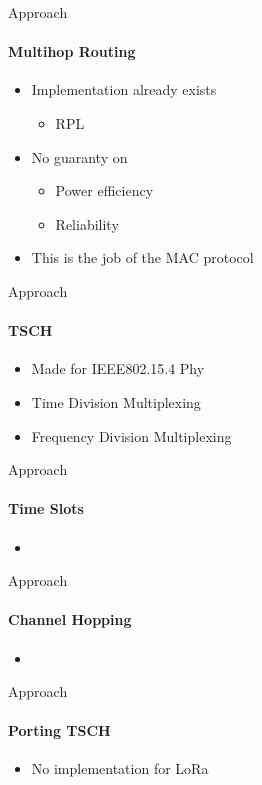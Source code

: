 \begin{frame}{Approach}
\framesubtitle{Multihop Routing}

\begin{itemize}
    \item Implementation already exists
    \begin{itemize}
        \item RPL
    \end{itemize}
    \item No guaranty on
    \begin{itemize}
        \item Power efficiency
        \item Reliability
    \end{itemize}
    \item This is the job of the MAC protocol
\end{itemize}
\end{frame}

\begin{frame}{Approach}
\framesubtitle{TSCH}

\begin{itemize}
    \item Made for IEEE802.15.4 Phy
    \item Time Division Multiplexing
    \item Frequency Division Multiplexing
\end{itemize}
\end{frame}

\begin{frame}{Approach}
\framesubtitle{Time Slots}

\begin{itemize}
    \item 
\end{itemize}
\end{frame}

\begin{frame}{Approach}
\framesubtitle{Channel Hopping}

\begin{itemize}
    \item 
\end{itemize}
\end{frame}

\begin{frame}{Approach}
\framesubtitle{Porting TSCH}

\begin{itemize}
    \item No implementation for LoRa
\end{itemize}
\end{frame}
